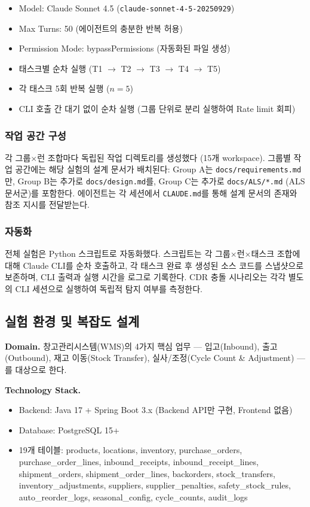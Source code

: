 \documentclass[conference]{IEEEtran}
\begin{document}
\begin{itemize}
  \item Model: Claude Sonnet 4.5 (\texttt{claude-sonnet-4-5-20250929})
  \item Max Turns: 50 (에이전트의 충분한 반복 허용)
  \item Permission Mode: bypassPermissions (자동화된 파일 생성)
  \item 태스크별 순차 실행 (T1 $\rightarrow$ T2 $\rightarrow$ T3 $\rightarrow$ T4 $\rightarrow$ T5)
  \item 각 태스크 5회 반복 실행 ($n=5$)
  \item CLI 호출 간 대기 없이 순차 실행 (그룹 단위로 분리 실행하여 Rate limit 회피)
\end{itemize}

\subsubsection{작업 공간 구성}

각 그룹$\times$런 조합마다 독립된 작업 디렉토리를 생성했다 (15개 workspace). 그룹별 작업 공간에는 해당 실험의 설계 문서가 배치된다: Group A는 \texttt{docs/requirements.md}만, Group B는 추가로 \texttt{docs/design.md}를, Group C는 추가로 \texttt{docs/ALS/*.md} (ALS 문서군)를 포함한다. 에이전트는 각 세션에서 \texttt{CLAUDE.md}를 통해 설계 문서의 존재와 참조 지시를 전달받는다.

\subsubsection{자동화}

전체 실험은 Python 스크립트로 자동화했다. 스크립트는 각 그룹$\times$런$\times$태스크 조합에 대해 Claude CLI를 순차 호출하고, 각 태스크 완료 후 생성된 소스 코드를 스냅샷으로 보존하며, CLI 출력과 실행 시간을 로그로 기록한다. CDR 충돌 시나리오는 각각 별도의 CLI 세션으로 실행하여 독립적 탐지 여부를 측정한다.

\subsection{실험 환경 및 복잡도 설계}

\textbf{Domain.} 창고관리시스템(WMS)의 4가지 핵심 업무 --- 입고(Inbound), 출고(Outbound), 재고 이동(Stock Transfer), 실사/조정(Cycle Count \& Adjustment) --- 를 대상으로 한다.

\textbf{Technology Stack.}
\begin{itemize}
  \item Backend: Java 17 + Spring Boot 3.x (Backend API만 구현, Frontend 없음)
  \item Database: PostgreSQL 15+
  \item 19개 테이블: products, locations, inventory, purchase\_orders, purchase\_order\_lines, inbound\_receipts, inbound\_receipt\_lines, shipment\_orders, shipment\_order\_lines, backorders, stock\_transfers, inventory\_adjustments, suppliers, supplier\_penalties, safety\_stock\_rules, auto\_reorder\_logs, seasonal\_config, cycle\_counts, audit\_logs
\end{itemize}
\end{document}
